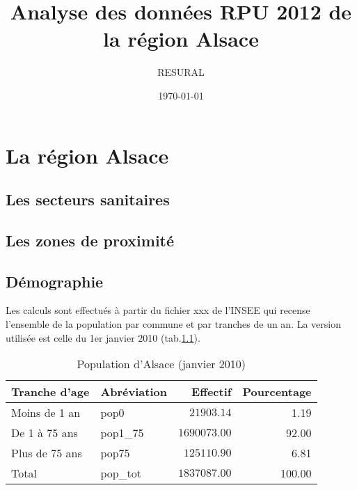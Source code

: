 \documentclass[12pt,english,french]{report}
\begin{document}
 


\title{Analyse des données RPU 2012 de la région Alsace}
\author{RESURAL}
\date{\today}
\maketitle

\tableofcontents
\listoftables
\listoffigures







\chapter{La région Alsace}
\section{Les secteurs sanitaires}
\section{Les zones de proximité}
\section{Démographie}
Les calculs sont effectués à partir du fichier xxx de l'INSEE qui recense l'ensemble de la population par commune et par tranches de un an. La version utilisée est celle du 1er janvier 2010 (tab.\ref{pop}).

\begin{table}
\begin{center}
\begin{tabular}{|l|l|r|r|}
  \hline
  Tranche d'age & Abréviation & Effectif & Pourcentage \\
  \hline
  \hline
  Moins de 1 an & pop0 & $21903.14$ & 1.19 \\
  De 1 à 75 ans & pop1\_75 & $1690073.00$ & 92.00 \\
  Plus de 75 ans& pop75 & $125110.90$ & 6.81 \\
  \hline
  Total & pop\_tot & $1837087.00$ & 100.00 \\
  \hline
\end{tabular}
\caption{Population d'Alsace (janvier 2010)}
\label{pop}
\end{center}
\end{table}
\end{document}
